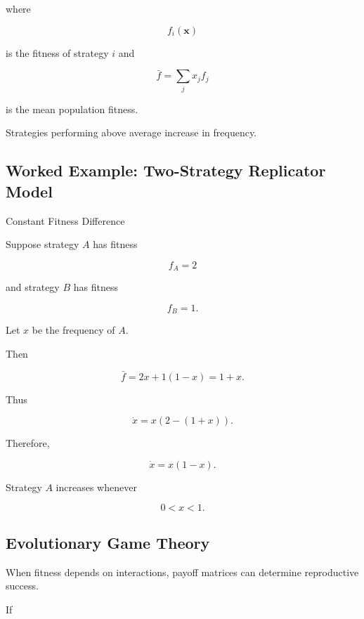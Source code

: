 where

\[
f_i(\mathbf{x})
\]

is the fitness of strategy \(i\) and

\[
\boxed{
\bar{f}
=
\sum_jx_jf_j
}
\]

is the mean population fitness.

Strategies performing above average increase in frequency.

\subsection{Worked Example: Two-Strategy Replicator Model}
\label{subsec:worked-two-strategy-replicator}

\begin{workedexamplebox}{Constant Fitness Difference}

Suppose strategy \(A\) has fitness

\[
f_A=2
\]

and strategy \(B\) has fitness

\[
f_B=1.
\]

Let \(x\) be the frequency of \(A\).

Then

\[
\bar f
=
2x+1(1-x)
=
1+x.
\]

Thus

\[
\dot{x}
=
x
\left(
2-(1+x)
\right).
\]

Therefore,

\begin{answerbox}
\[
\boxed{
\dot{x}
=
x(1-x).
}
\]
\end{answerbox}

Strategy \(A\) increases whenever

\[
0<x<1.
\]

\end{workedexamplebox}

\subsection{Evolutionary Game Theory}
\label{subsec:evolutionary-game-theory}

When fitness depends on interactions, payoff matrices can determine
reproductive success.

If


